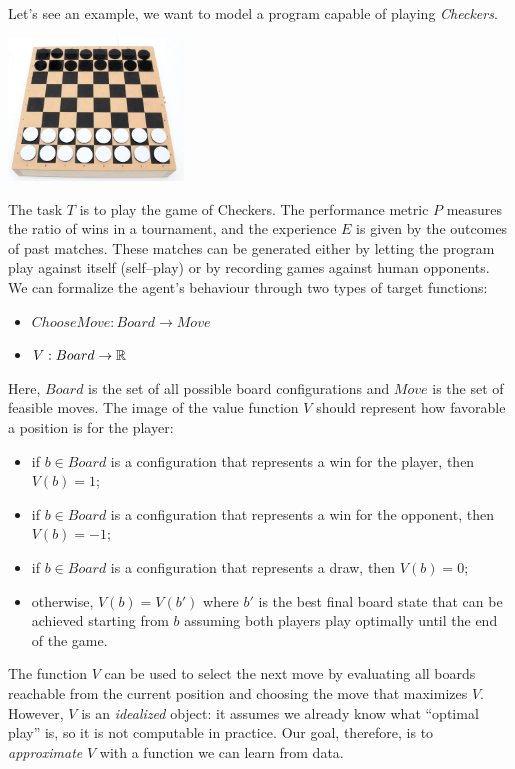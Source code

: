 \documentclass[10pt, letterpaper]{report}
\begin{document}
Let's see an example, we want to model a program capable of playing \textit{Checkers}.
\begin{center}
	\includegraphics[width=0.35\textwidth]{images/Checkers.jpg}
\end{center}
The task $T$ is to play the game of Checkers. The performance metric $P$ measures the ratio of wins in a tournament, and the experience $E$ is given by the outcomes of past matches. These matches can be generated either by letting the program play against itself (self–play) or by recording games against human opponents. We can formalize the agent’s behaviour through two types of target functions:
\begin{itemize}
	\item $ChooseMove : Board \rightarrow Move$
	\item $V : Board \rightarrow {\mathbb R}$
\end{itemize}
Here, $Board$ is the set of all possible board configurations and $Move$ is the set of feasible moves. The image of the value function $V$ should represent how favorable a position is for the player:
\begin{itemize}
	\item if $b\in Board$ is a configuration that represents a win for the player, then $V(b)=1$;
	\item if $b\in Board$ is a configuration that represents a win for the opponent, then $V(b)=-1$;
	\item if $b\in Board$ is a configuration that represents a draw, then $V(b)=0$;
	\item otherwise, $V(b)=V(b')$ where $b'$ is the best final board state that can be achieved starting from $b$ assuming both players play optimally until the end of the game.
\end{itemize}

The function $V$ can be used to select the next move by evaluating all boards reachable from the current position and choosing the move that maximizes $V$. However, $V$ is an \emph{idealized} object: it assumes we already know what ``optimal play'' is, so it is not computable in practice. Our goal, therefore, is to \emph{approximate} $V$ with a function we can learn from data.
\end{document}
